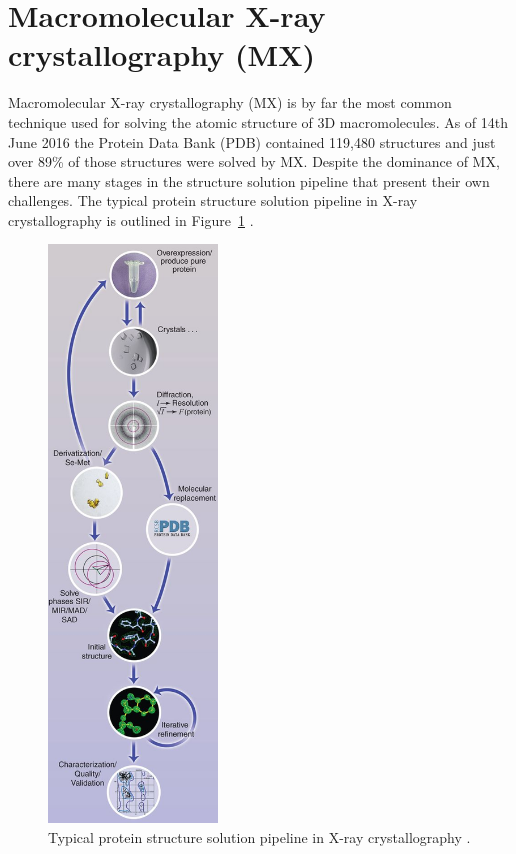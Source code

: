 \section{Macromolecular X-ray crystallography (MX)}
\label{sec:X-ray crystallography}

    Macromolecular X-ray crystallography (MX) is by far the most common technique used for solving the atomic structure of 3D macromolecules.
    As of 14th June 2016 the Protein Data Bank (PDB) contained 119,480 structures and just over 89\% of those structures were solved by MX.
    Despite the dominance of MX, there are many stages in the structure solution pipeline that present their own challenges.
    The typical protein structure solution pipeline in X-ray crystallography is outlined in Figure~\ref{fig:Crystallography-pipeline} \cite{garman2014}.

    \begin{figure}
        \centering
        \includegraphics[width=0.4\textwidth]{figures/introduction/crystallography_pipeline.jpg}
        \caption[MX structure solution pipeline.]{Typical protein structure solution pipeline in X-ray crystallography \cite{garman2014}.}
        \label{fig:Crystallography-pipeline}
    \end{figure}

